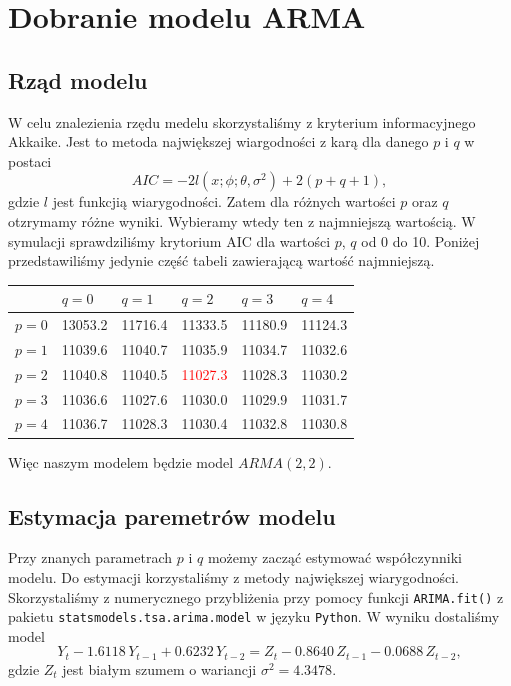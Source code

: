 \documentclass[12pt]{article}
\theoremstyle{exer}
\begin{document}
	\section{Dobranie modelu ARMA}
	\subsection{Rząd modelu}
	W celu znalezienia rzędu medelu skorzystaliśmy z kryterium informacyjnego Akkaike. Jest to metoda największej wiargodności z karą dla danego $p$ i $q$ w postaci
	\begin{equation}
		AIC=-2l(x;\phi;\theta,\sigma^2)+2(p+q+1),
	\end{equation}
	gdzie $l$ jest funkcjią wiarygodności. Zatem dla różnych wartości $p$ oraz $q$ otzrymamy różne wyniki. Wybieramy wtedy ten z najmniejszą wartością. W symulacji sprawdziliśmy krytorium AIC dla wartości $p$, $q$ od 0 do 10. Poniżej przedstawiliśmy jedynie część tabeli zawierającą wartość najmniejszą.
	\begin{table}[H]
		\centering
		\begin{tabularx}{4\textwidth/5}{|Y|Y|Y|Y|Y|Y|}
			\hline
			& $q=0$ & $q=1$ & $q=2$ & $q=3$ & $q=4$ \\\hline
			$p=0$ & 13053.2 & 11716.4 & 11333.5 & 11180.9 & 11124.3 \\\hline
			$p=1$ & 11039.6 & 11040.7 & 11035.9 & 11034.7 & 11032.6 \\\hline
			$p=2$ & 11040.8 & 11040.5 & \textcolor{red}{11027.3} & 11028.3 & 11030.2 \\\hline
			$p=3$ & 11036.6 & 11027.6 & 11030.0 & 11029.9 & 11031.7 \\\hline
			$p=4$ & 11036.7 & 11028.3 & 11030.4 & 11032.8 & 11030.8 \\\hline
		\end{tabularx}
	\end{table}
Więc naszym modelem będzie model $ARMA(2,2)$.
	\subsection{Estymacja paremetrów modelu}
	Przy znanych parametrach $p$ i $q$ możemy zacząć estymować współczynniki modelu. Do estymacji korzystaliśmy z metody największej wiarygodności. Skorzystaliśmy z numerycznego przybliżenia przy pomocy funkcji \verb*|ARIMA.fit()| z pakietu \verb*|statsmodels.tsa.arima.model| w języku \verb*|Python|. W wyniku dostaliśmy model
	\begin{equation}
		Y_t-1.6118\,Y_{t-1}+0.6232\,Y_{t-2}=Z_t-0.8640\,Z_{t-1}-0.0688\,Z_{t-2},
	\end{equation}
     gdzie $Z_t$ jest białym szumem o wariancji $\sigma^2=4.3478$.
	
\end{document}
